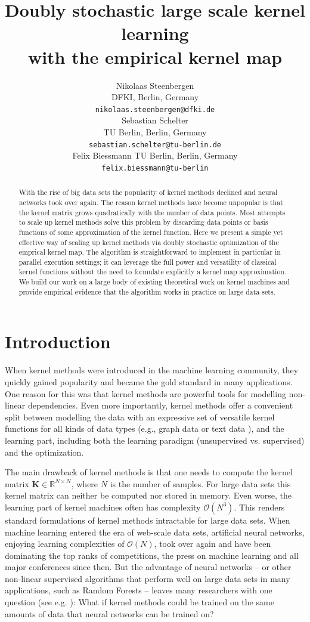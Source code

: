 \documentclass{article} %
\title{Doubly stochastic large scale kernel learning \\ with the empirical kernel map}
\author{
Nikolaas Steenbergen\\
DFKI, Berlin, Germany\\
\texttt{nikolaas.steenbergen@dfki.de}\\
\And
Sebastian Schelter\\
TU Berlin, Berlin, Germany\\
\texttt{sebastian.schelter@tu-berlin.de}\\
\And
Felix Biessmann
TU Berlin, Berlin, Germany\\
\texttt{felix.biessmann@tu-berlin}\\
}
\newcommand{\R}{\ensuremath{\mathds{R}}}
\renewcommand{\vec}[1]{\mathbf{#1}}
\begin{document}
\maketitle

\begin{abstract} 
With the rise of big data sets the popularity of kernel methods declined and neural networks took over again. The reason kernel methods have become unpopular is that the kernel matrix grows quadratically with the number of data points. Most attempts to scale up kernel methods  solve this problem by discarding data points or basis functions of some approximation of the kernel function. Here we present a simple yet effective way of scaling up kernel methods via doubly stochastic optimization of the emprical kernel map. The algorithm is straightforward to implement in particular in parallel execution settings; it can leverage the full power and versatility of classical kernel functions without the need to formulate explicitly a kernel map approximation.
We build our work on a large body of existing theoretical work on kernel machines and provide empirical evidence that the algorithm works in practice on large data sets. 
\end{abstract} 


\section{Introduction\vspace{-0.1in}}
\indent When kernel methods \cite{Muller:2001p2592,shawe2004kernel} were introduced in the machine learning community, they quickly gained popularity and became the gold standard in many applications. One reason for this was that kernel methods are powerful tools for modelling non-linear dependencies. Even more importantly, kernel methods offer a convenient split between modelling the data with an expressive set of versatile kernel functions for all kinds of data types (e.g., graph data \cite{shawe2004kernel} or text data \cite{John2000}), and the learning part, including both the learning paradigm (unsupervised vs. supervised) and the optimization. 

The main drawback of kernel methods is that one needs to compute the kernel matrix $\vec{K}\in\R^{N\times N}$, where $N$ is the number of samples. For large data sets this kernel matrix can neither be computed nor stored in memory. Even worse, the learning part of kernel machines often has complexity $\mathcal{O}(N^3)$. This renders standard formulations of kernel methods intractable for large data sets. When machine learning entered the era of web-scale data sets, artificial neural networks, enjoying learning complexities of $\mathcal{O}(N)$, took over again and have been dominating the top ranks of competitions, the press on machine learning and all major conferences since then. But the advantage of neural networks -- or other non-linear supervised algorithms that perform well on large data sets in many applications, such as Random Forests \cite{Breiman2001} -- leaves many researchers with one question (see e.g. \cite{Lu2014}): What if kernel methods could be trained on the same amounts of data that neural networks can be trained on? 
\end{document}
